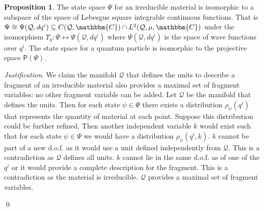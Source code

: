 \documentclass[aps,pra,10pt,twocolumn,floatfix,nofootinbib]{revtex4-1}
\numberwithin{equation}{section}
\theoremstyle{definition}
\newtheorem{prop}[equation]{Proposition}
\newenvironment{justification}{\emph{Justification}.}{\qed}
\begin{document}
\begin{prop}\label{prop:wavefuntion}
	The state space $\Psi$ for an irreducible material is isomorphic to a subspace of the space of Lebesgue square integrable continuous functions. That is $\Psi \cong \Psi(\mathcal{Q}, dq^i) \subseteq C(\mathcal{Q}, \mathbbm{C}) \cap L^2(\mathcal{Q}, \mu, \mathbbm{C})$ under the isomorphism $\Upsilon_q : \Psi \leftrightarrow \Psi(\mathcal{Q}, dq^i)$ where $\Psi(\mathcal{Q}, dq^i)$ is the space of wave functions over $q^i$. The state space for a quantum particle is isomorphic to the projective space $\mathsf{P}(\Psi)$.
\end{prop}

\begin{justification}
	We claim the manifold $\mathcal{Q}$ that defines the units to describe a fragment of an irreducible material also provides a maximal set of fragment variables: no other fragment variable can be added. Let $\mathcal{Q}$ be the manifold that defines the units. Then for each state $\psi \in \Psi$ there exists a distribution $\rho_\psi(q^i)$ that represents the quantity of material at each point. Suppose this distribution could be further refined. Then another independent variable $k$ would exist such that for each state $\psi \in \Psi$ we would have a distribution $\rho_\psi(q^i, k)$. $k$ cannot be part of a new d.o.f. as it would use a unit defined independently from $\mathcal{Q}$. This is a contradiction as $\mathcal{Q}$ defines all units. $k$ cannot lie in the same d.o.f. as of one of the $q^i$ or it would provide a complete description for the fragment. This is a contradiction as the material is irreducible. $\mathcal{Q}$ provides a maximal set of fragment variables.
	

\end{justification}
\end{document}
